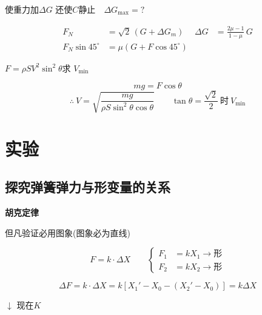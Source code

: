 \begin{problem}
使重力加$\Delta G$ 还使$C$静止　$\Delta G_{\max}=?$ %


\begin{solution}
\begin{align*}
F_N&=\sqrt2\,(G+\Delta G_m) & \Delta G&=\frac{2\mu-1}{1-\mu}\,G\\
F_N\sin45^\circ&=\mu(G+F\cos45^\circ)
\end{align*}
\end{solution}
\end{problem}

\begin{problem}[3]

$F=\rho SV^2\sin^2\theta$\quad 求 $V_{\min}$
\begin{solution}
\[mg=F\cos\theta\]
\[\therefore\ V=\sqrt{\frac{mg}{\rho S\sin^2\theta\cos\theta}}\qquad \tan\theta=\frac{\sqrt{2}}{2}\ \text{时}\ V_{\min}\] %

\end{solution}
\end{problem}


\section{实验}
\subsection{探究弹簧弹力与形变量的关系}
\textbf{胡克定律}

但凡验证必用图象(图象必为直线)

\[
F=k\cdot\Delta X\qquad
\left\{
\begin{aligned}
F_1&=kX_1\to\text{形}\\
F_2&=kX_2\to\text{形}
\end{aligned}
\right.
\]

\[
\Delta F=k\cdot\Delta X=k\left[X_1'-X_0-(X_2'-X_0)\right]=k\Delta X
\]

$\downarrow$ 现在$K$ %

